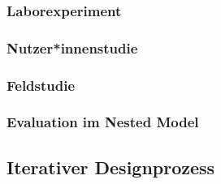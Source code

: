             \subsubsection{Laborexperiment} %

            \subsubsection{Nutzer*innenstudie} %

            \subsubsection{Feldstudie} %

            \subsubsection{Evaluation im Nested Model} %

        \subsection{Iterativer Designprozess} %
